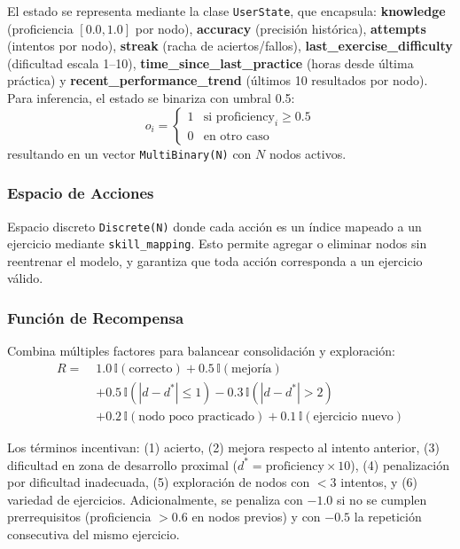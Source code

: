 El estado se representa mediante la clase \texttt{UserState}, que encapsula: \textbf{knowledge} (proficiencia $[0.0, 1.0]$ por nodo), \textbf{accuracy} (precisión histórica), \textbf{attempts} (intentos por nodo), \textbf{streak} (racha de aciertos/fallos), \textbf{last\_exercise\_difficulty} (dificultad escala 1--10), \textbf{time\_since\_last\_practice} (horas desde última práctica) y \textbf{recent\_performance\_trend} (últimos 10 resultados por nodo). Para inferencia, el estado se binariza con umbral 0.5:
\begin{equation}
o_i = \begin{cases} 
1 & \text{si } \text{proficiency}_i \geq 0.5 \\
0 & \text{en otro caso}
\end{cases}
\end{equation}
resultando en un vector \texttt{MultiBinary(N)} con $N$ nodos activos.

\subsubsection{Espacio de Acciones}

Espacio discreto \texttt{Discrete(N)} donde cada acción es un índice mapeado a un ejercicio mediante \texttt{skill\_mapping}. Esto permite agregar o eliminar nodos sin reentrenar el modelo, y garantiza que toda acción corresponda a un ejercicio válido.

\subsubsection{Función de Recompensa}

Combina múltiples factores para balancear consolidación y exploración:
\begin{equation}
\begin{aligned}
R =\;&
1.0\,\mathbb{I}(\text{correcto})
+ 0.5\,\mathbb{I}(\text{mejoría}) \\
&+ 0.5\,\mathbb{I}\!\left(
    \left| d - d^{*} \right| \leq 1
\right)
- 0.3\,\mathbb{I}\!\left(
    \left| d - d^{*} \right| > 2
\right) \\
&+ 0.2\,\mathbb{I}(\text{nodo poco practicado})
+ 0.1\,\mathbb{I}(\text{ejercicio nuevo})
\end{aligned}
\end{equation}

Los términos incentivan: (1) acierto, (2) mejora respecto al intento anterior, (3) dificultad en zona de desarrollo proximal ($d^* = \text{proficiency} \times 10$), (4) penalización por dificultad inadecuada, (5) exploración de nodos con $<3$ intentos, y (6) variedad de ejercicios. Adicionalmente, se penaliza con $-1.0$ si no se cumplen prerrequisitos (proficiencia $>0.6$ en nodos previos) y con $-0.5$ la repetición consecutiva del mismo ejercicio.


